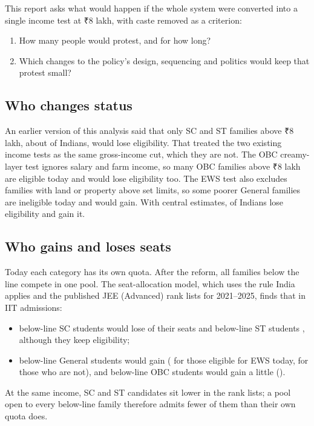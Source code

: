 \documentclass[11pt,a4paper]{article}
\newcommand{\rupee}{{\rupeefont ₹}}
\begin{document}
This report asks what would happen if the whole system were converted into a single income test at \rupee8 lakh, with caste removed as a criterion:
\begin{enumerate}
\item How many people would protest, and for how long?
\item Which changes to the policy's design, sequencing and politics would keep that protest small?
\end{enumerate}

\subsection{Who changes status}
An earlier version of this analysis said that only SC and ST families above \rupee8 lakh, about \EligibilityOriginal{} of Indians, would lose eligibility. That treated the two existing income tests as the same gross-income cut, which they are not. The OBC creamy-layer test ignores salary and farm income, so many OBC families above \rupee8 lakh are eligible today and would lose eligibility too. The EWS test also excludes families with land or property above set limits, so some poorer General families are ineligible today and would gain. With central estimates, \EligibilityLose{} of Indians lose eligibility and \EligibilityGain{} gain it.

\subsection{Who gains and loses seats}
Today each category has its own quota. After the reform, all families below the line compete in one pool. The seat-allocation model, which uses the rule India applies and the published JEE (Advanced) rank lists for 2021--2025, finds that in IIT admissions:
\begin{itemize}
\item below-line SC students would lose \AllocChangeSCBelow{} of their seats and below-line ST students \AllocChangeSTBelow, although they keep eligibility;
\item below-line General students would gain (\AllocChangeEWS{} for those eligible for EWS today, \AllocChangeGENBelow{} for those who are not), and below-line OBC students would gain a little (\AllocChangeOBCBelow).
\end{itemize}
At the same income, SC and ST candidates sit lower in the rank lists; a pool open to every below-line family therefore admits fewer of them than their own quota does.
\end{document}
